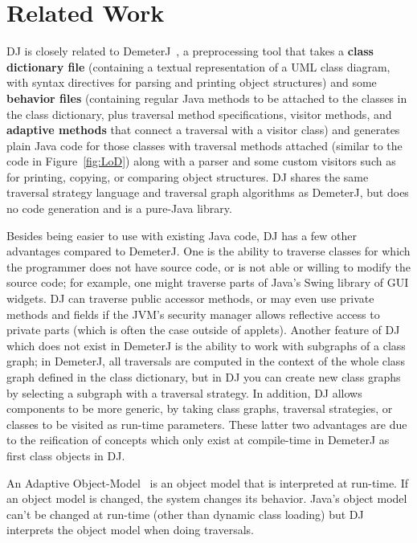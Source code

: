 \documentclass{llncs}
\newcommand{\defn}[1]{\textbf{#1}}
\begin{document}
\section{Related Work}

DJ is closely related to DemeterJ~\cite{DemeterJ:00}, a preprocessing
tool that takes a \defn{class dictionary file} (containing a textual
representation of a UML class diagram, with syntax directives for
parsing and printing object structures) and some \defn{behavior files}
(containing regular Java methods to be attached to the classes in the
class dictionary, plus traversal method specifications, visitor
methods, and \defn{adaptive methods} that connect a traversal with a
visitor class) and generates plain Java code for those classes with
traversal methods attached (similar to the code in
Figure~\ref{fig:LoD}) along with a parser and some custom visitors
such as for printing, copying, or comparing object structures.  DJ
shares the same traversal strategy language and traversal graph
algorithms as DemeterJ, but does no code generation and is a pure-Java
library.

Besides being easier to use with existing Java code, DJ has a few
other advantages compared to DemeterJ.  One is the ability to traverse
classes for which the programmer does not have source code, or is not
able or willing to modify the source code; for example, one might
traverse parts of Java's Swing library of GUI widgets.  DJ can
traverse public accessor methods, or may even use private methods and
fields if the JVM's security manager allows reflective access to
private parts (which is often the case outside of applets).  Another
feature of DJ which does not exist in DemeterJ is the ability to work
with subgraphs of a class graph; in DemeterJ, all traversals are
computed in the context of the whole class graph defined in the class
dictionary, but in DJ you can create new class graphs by selecting a
subgraph with a traversal strategy.  In addition, DJ allows components
to be more generic, by taking class graphs, traversal strategies, or
classes to be visited as run-time parameters.  These latter two
advantages are due to the reification of concepts which only exist at
compile-time in DemeterJ as first class objects in DJ.

An Adaptive Object-Model~\cite{AOM} is an object model that is
interpreted at run-time.  If an object model is changed, the system
changes its behavior.  Java's object model can't be changed at
run-time (other than dynamic class loading) but DJ interprets the
object model when doing traversals.
\end{document}
